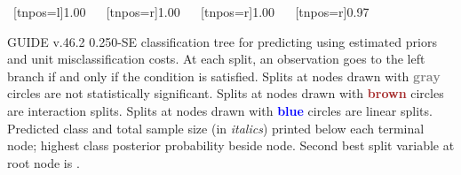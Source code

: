 \documentclass{article}
\begin{document}
\begin{landscape}
\begin{center}
{{{{{{{{ }{
    ~[tnpos=l]{1.00}
    ~{}
    ~[tnpos=r]{1.00}
    ~{}
   }
   }
   }
   }
   }
    ~[tnpos=r]{1.00}
    ~{}
   }
   }
    ~[tnpos=r]{0.97}
    ~{}
 }
 \end{center}
GUIDE v.46.2 0.250-SE
classification tree for predicting \texttt{} using
estimated priors
and unit misclassification costs.
At each split, an observation goes to the left branch 
 if and only if the condition is satisfied.
 Splits at nodes drawn with \textbf{\textcolor{gray}{gray}} circles are not statistically significant.
 Splits at nodes drawn with \textbf{\textcolor{brown}{brown}} circles are interaction splits.
 Splits at nodes drawn with \textbf{\textcolor{blue}{blue}} circles are linear splits.
 Predicted class and total sample size (in \emph{italics}) printed below each terminal node;
 highest class posterior probability beside node.
 Second best split variable at root node is \texttt{}.
 \end{landscape}
 
\end{document}
